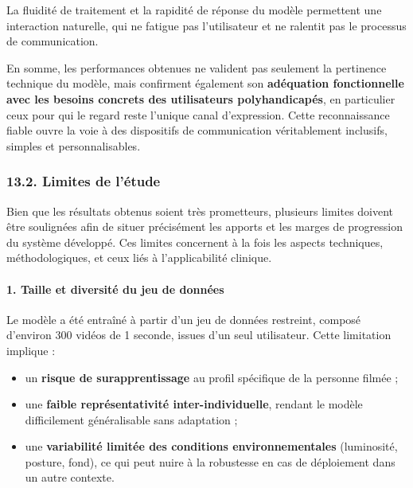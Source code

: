 \documentclass[
]{article}
\begin{document}
La fluidité de traitement et la rapidité de réponse du modèle permettent une interaction naturelle, qui ne fatigue pas l'utilisateur et ne ralentit pas le processus de communication.

En somme, les performances obtenues ne valident pas seulement la pertinence technique du modèle, mais confirment également son \textbf{adéquation fonctionnelle avec les besoins concrets des utilisateurs polyhandicapés}, en particulier ceux pour qui le regard reste l'unique canal d'expression. Cette reconnaissance fiable ouvre la voie à des dispositifs de communication véritablement inclusifs, simples et personnalisables.

\hypertarget{limites-de-luxe9tude}{%
\subsubsection{13.2. Limites de l'étude}\label{limites-de-luxe9tude}}

Bien que les résultats obtenus soient très prometteurs, plusieurs limites doivent être soulignées afin de situer précisément les apports et les marges de progression du système développé. Ces limites concernent à la fois les aspects techniques, méthodologiques, et ceux liés à l'applicabilité clinique.

\hypertarget{taille-et-diversituxe9-du-jeu-de-donnuxe9es}{%
\paragraph{\texorpdfstring{\textbf{1. Taille et diversité du jeu de données}}{1. Taille et diversité du jeu de données}}\label{taille-et-diversituxe9-du-jeu-de-donnuxe9es}}

Le modèle a été entraîné à partir d'un jeu de données restreint, composé d'environ 300 vidéos de 1 seconde, issues d'un seul utilisateur. Cette limitation implique :

\begin{itemize}
\item
  un \textbf{risque de surapprentissage} au profil spécifique de la personne filmée ;
\item
  une \textbf{faible représentativité inter-individuelle}, rendant le modèle difficilement généralisable sans adaptation ;
\item
  une \textbf{variabilité limitée des conditions environnementales} (luminosité, posture, fond), ce qui peut nuire à la robustesse en cas de déploiement dans un autre contexte.
\end{itemize}
\end{document}
